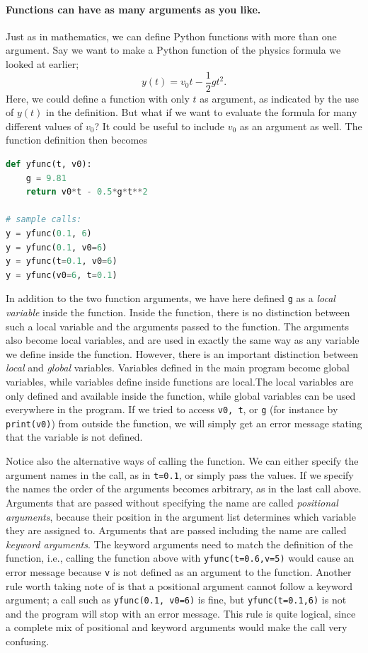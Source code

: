 \documentclass[graybox,envcountchap,sectrefs,final]{svmonodo}
\begin{document}
\paragraph{Functions can have as many arguments as you like.}
Just as in mathematics, we can define Python functions with more than one argument. Say we want to make a Python function
of the physics formula we looked at earlier;
\[ y(t) = v_0t- \frac{1}{2}gt^2 .\]
Here, we could define a function with only $t$ as argument, as indicated by the use of $y(t)$ in the definition. But
what if we want to evaluate the formula for many different values of $v_0$? It could be useful to include $v_0$ as an argument
as well. The function definition then becomes
\begin{lstlisting}[language=Python,style=blue1bar]
def yfunc(t, v0):
    g = 9.81
    return v0*t - 0.5*g*t**2

# sample calls:
y = yfunc(0.1, 6)
y = yfunc(0.1, v0=6)
y = yfunc(t=0.1, v0=6)
y = yfunc(v0=6, t=0.1)
\end{lstlisting}

In addition to the two function arguments, we have here defined \texttt{g} as a \emph{local variable} inside the function. Inside the
function, there is no distinction between such a local variable and the arguments passed to the function. The arguments also
become local variables, and are used in exactly the same way as any variable we define inside the function. However, there
is an important distinction between \emph{local} and \emph{global} variables. Variables defined in the main program become global
variables, while variables define
inside functions are local.The local variables are only defined and available
inside the function, while global variables can be used everywhere in the program. If we tried to access \texttt{v0, t}, or
\texttt{g} (for instance by \texttt{print(v0)}) from outside the function,
we will simply get an error message stating that the variable is not defined.

Notice
also the alternative ways of calling the function. We can either specify the argument names in the call, as in \texttt{t=0.1}, or
simply pass the values. If we specify the names the order of the arguments becomes arbitrary, as in the last call above.
Arguments that are passed without specifying the name are called \emph{positional arguments}, because their position in the
argument list determines which variable they are assigned to. Arguments that are passed including the name are called
\emph{keyword arguments}. The keyword arguments need to match the definition of the function, i.e., calling the
function above with \texttt{yfunc(t=0.6,v=5)} would cause an error message because \texttt{v} is not defined as an argument to the function.
Another rule worth taking note of is that a positional argument cannot follow a keyword argument; a call such as
\texttt{yfunc(0.1, v0=6)} is fine, but \texttt{yfunc(t=0.1,6)} is not and the program will stop with an error message. This rule is
quite logical, since a complete mix of positional and keyword arguments would make the call very confusing.
\end{document}
